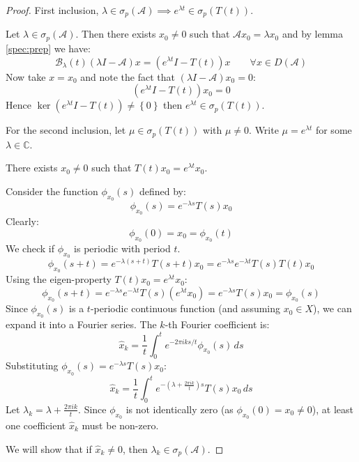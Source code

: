 \documentclass[12pt, oneside]{book}
\newcommand{\A}{\mathscr{A}}
\newcommand{\B}{\mathscr{B}}
\begin{document}
\begin{proof}
First inclusion, $\lambda \in \sigma_p(\A) \implies e^{\lambda t} \in \sigma_p(T(t))$.

Let $\lambda \in \sigma_p(\A)$. Then there exists $x_0 \neq 0$ such that $\A x_0 = \lambda x_0$ and by lemma \ref{spec:prep} we have:
$$
\B_{\lambda}(t) (\lambda I - \A) x = \left(e^{\lambda t} I - T(t)\right)x \quad\quad \forall x \in D(\A)
$$
Now take $x = x_0$ and note the fact that $(\lambda I - \A) x_0 = 0$:
$$
\left(e^{\lambda t} I - T(t)\right)x_0 = 0
$$
Hence $\ker{\left(e^{\lambda t} I - T(t)\right)} \neq \left\{ 0 \right\}$ then $e^{\lambda t} \in \sigma_p(T(t))$.

For the second inclusion, let $\mu \in \sigma_p(T(t))$ with $\mu \neq 0$. Write $\mu = e^{\lambda t}$ for some $\lambda \in \mathbb{C}$.

There exists $x_0 \neq 0$ such that $T(t)x_0 = e^{\lambda t}x_0$.

Consider the function $\phi_{x_0}(s)$ defined by:
$$
\phi_{x_0}(s) = e^{-\lambda s} T(s) x_0
$$
Clearly:
$$
\phi_{x_0}(0) = x_0 = \phi_{x_0}(t)
$$
We check if $\phi_{x_0}$ is periodic with period $t$.
$$
\phi_{x_0}(s+t) = e^{-\lambda(s+t)} T(s+t)x_0 = e^{-\lambda s} e^{-\lambda t} T(s) T(t) x_0
$$
Using the eigen-property $T(t)x_0 = e^{\lambda t}x_0$:
$$
\phi_{x_0}(s+t) = e^{-\lambda s} e^{-\lambda t} T(s) (e^{\lambda t} x_0) = e^{-\lambda s} T(s) x_0 = \phi_{x_0}(s)
$$
Since $\phi_{x_0}(s)$ is a $t$-periodic continuous function (and assuming $x_0 \in X$), we can expand it into a Fourier series. The $k$-th Fourier coefficient is:
$$
\hat{x}_k = \frac{1}{t} \int_0^t e^{-2\pi i k s / t} \phi_{x_0}(s) \, ds
$$
Substituting $\phi_{x_0}(s) = e^{-\lambda s} T(s) x_0$:
$$
\hat{x}_k = \frac{1}{t} \int_0^t e^{-(\lambda + \frac{2\pi i k}{t}) s} T(s) x_0 \, ds
$$
Let $\lambda_k = \lambda + \frac{2\pi i k}{t}$. Since $\phi_{x_0}$ is not identically zero (as $\phi_{x_0}(0) = x_0 \neq 0$), at least one coefficient $\hat{x}_k$ must be non-zero.

We will show that if $\hat{x}_k \neq 0$, then $\lambda_k \in \sigma_p(\A)$.


\end{proof}
\end{document}
